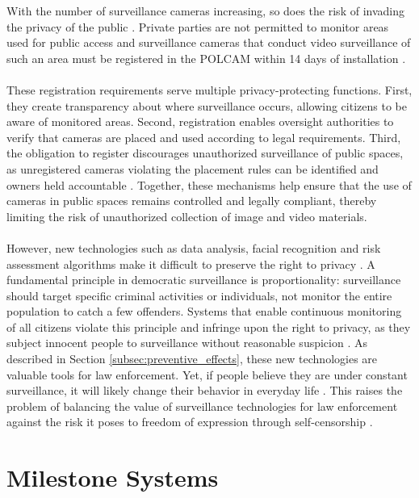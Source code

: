 With the number of surveillance cameras increasing, so does the risk of invading the privacy of the public \cite{overvagningsekspert2025}. Private parties are not permitted to monitor areas used for public access \cite{lov_tv_overvaagning2023} and surveillance cameras that conduct video surveillance of such an area must be registered in the \acs{POLCAM} within 14 days of installation \cite{politiet2024registrer}. 
\\\\
These registration requirements serve multiple privacy-protecting functions. First, they create transparency about where surveillance occurs, allowing citizens to be aware of monitored areas. Second, registration enables oversight authorities to verify that cameras are placed and used according to legal requirements. Third, the obligation to register discourages unauthorized surveillance of public spaces, as unregistered cameras violating the placement rules can be identified and owners held accountable \cite{kromann_polcam2021}. Together, these mechanisms help ensure that the use of cameras in public spaces remains controlled and legally compliant, thereby limiting the risk of unauthorized collection of image and video materials.
\\\\
However, new technologies such as data analysis, facial recognition and risk assessment algorithms make it difficult to preserve the right to privacy \cite{overvagningsekspert2025}. A fundamental principle in democratic surveillance is proportionality: surveillance should target specific criminal activities or individuals, not monitor the entire population to catch a few offenders. Systems that enable continuous monitoring of all citizens violate this principle and infringe upon the right to privacy, as they subject innocent people to surveillance without reasonable suspicion \cite{menneskeret_overvaagning,justitia_overvaagning}. As described in Section \ref{subsec:preventive_effects}, these new technologies are valuable tools for law enforcement. Yet, if people believe they are under constant surveillance, it will likely change their behavior in everyday life \cite{overvagningsekspert2025}. This raises the problem of balancing the value of surveillance technologies for law enforcement against the risk it poses to freedom of expression through self-censorship \cite{overvagningsekspert2025}.

\section{Milestone Systems}

